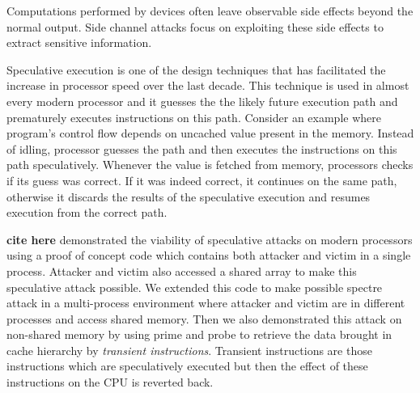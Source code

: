 Computations performed by devices often leave observable side effects beyond the normal output. Side channel attacks focus on exploiting these side effects to extract sensitive information. 

Speculative execution is one of the design techniques that has facilitated the increase in processor speed over the last decade. This technique is used in almost every modern processor and it guesses the the likely future execution path and prematurely executes instructions on this path. Consider an example where program's control flow depends on uncached value present in the memory. Instead of idling, processor guesses the path and then executes the instructions on this path speculatively. Whenever the value is fetched from memory, processors checks if its guess was correct. If it was indeed correct, it continues on the same path, otherwise it discards the results of the speculative execution and resumes execution from the correct path.

\textbf{cite here} demonstrated the viability of speculative attacks on modern processors using a proof of concept code which contains both attacker and victim in a single process. Attacker and victim also accessed a shared array to make this speculative attack possible. We extended this code to make possible spectre attack in a multi-process environment where attacker and victim are in different processes and access shared memory. Then we also demonstrated this attack on non-shared memory by using prime and probe to retrieve the data brought in cache hierarchy by \textit{transient instructions}. Transient instructions are those instructions which are speculatively executed but then the effect of these instructions on the CPU is reverted back.